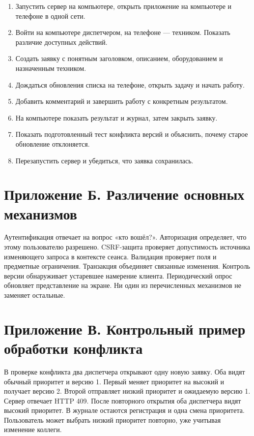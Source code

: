 \documentclass{timcw}
\begin{document}
\begin{enumerate}
\item Запустить сервер на компьютере, открыть приложение на компьютере и телефоне в одной сети.
\item Войти на компьютере диспетчером, на телефоне — техником. Показать различие доступных действий.
\item Создать заявку с понятным заголовком, описанием, оборудованием и назначенным техником.
\item Дождаться обновления списка на телефоне, открыть задачу и начать работу.
\item Добавить комментарий и завершить работу с конкретным результатом.
\item На компьютере показать результат и журнал, затем закрыть заявку.
\item Показать подготовленный тест конфликта версий и объяснить, почему старое обновление отклоняется.
\item Перезапустить сервер и убедиться, что заявка сохранилась.
\end{enumerate}

\section*{Приложение Б. Различение основных механизмов}

Аутентификация отвечает на вопрос «кто вошёл?». Авторизация определяет, что этому пользователю разрешено. CSRF-защита проверяет допустимость источника изменяющего запроса в контексте сеанса. Валидация проверяет поля и предметные ограничения. Транзакция объединяет связанные изменения. Контроль версии обнаруживает устаревшее намерение клиента. Периодический опрос обновляет представление на экране. Ни один из перечисленных механизмов не заменяет остальные.

\section*{Приложение В. Контрольный пример обработки конфликта}

В проверке конфликта два диспетчера открывают одну новую заявку. Оба видят обычный приоритет и версию 1. Первый меняет приоритет на высокий и получает версию 2. Второй отправляет низкий приоритет и ожидаемую версию 1. Сервер отвечает HTTP 409. После повторного открытия оба диспетчера видят высокий приоритет. В журнале остаются регистрация и одна смена приоритета. Пользователь может выбрать низкий приоритет повторно, уже учитывая изменение коллеги.
\end{document}
